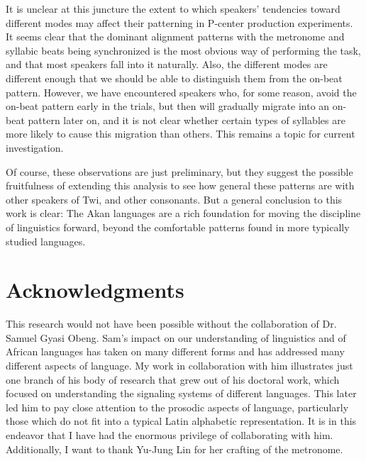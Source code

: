 \documentclass[output=paper,colorlinks,citecolor=brown]{langscibook}
\begin{document}
It is unclear at this juncture the extent to which speakers’ tendencies toward different modes may affect their patterning in P-center production experiments.  It seems clear that the dominant alignment patterns with the metronome and syllabic beats being synchronized is the most obvious way of performing the task, and that most speakers fall into it naturally. Also, the different modes are different enough that we should be able to distinguish them from the on-beat pattern. However, we have encountered speakers who, for some reason, avoid the on-beat pattern early in the trials, but then will gradually migrate into an on-beat pattern later on, and it is not clear whether certain types of syllables are more likely to cause this migration than others. This remains a topic for current investigation.\largerpage  

Of course, these observations are just preliminary, but they suggest the possible fruitfulness of extending this analysis to see how general these patterns are with other speakers of Twi, and other consonants. But a general conclusion to this work is clear: The Akan languages are a rich foundation for moving the discipline of linguistics forward, beyond the comfortable patterns found in more typically studied languages.  

 



\section*{Acknowledgments}

This research would not have been possible without the collaboration of Dr. Samuel Gyasi Obeng. Sam's impact on our understanding of linguistics and of African languages has taken on many different forms and has addressed many different aspects of language. My work in collaboration with him illustrates just one branch of his body of research that grew out of his doctoral work, which focused on understanding the signaling systems of different languages. This later led him to pay close attention to the prosodic aspects of language, particularly those which do not fit into a typical Latin alphabetic representation. It is in this endeavor that I have had the enormous privilege of collaborating with him. Additionally, I want to thank Yu-Jung Lin for her crafting of the metronome. 


{\sloppy\printbibliography[heading=subbibliography,notkeyword=this]}
\end{document}
